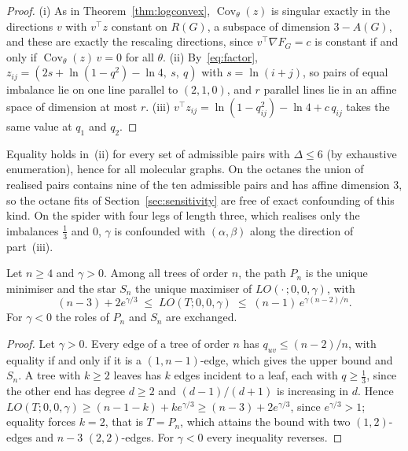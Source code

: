   \begin{proof}
  (i) As in Theorem~\ref{thm:logconvex}, $\operatorname{Cov}_{\theta}(z)$
  is singular exactly in the directions $v$ with $v^{\top} z$ constant on
  $R(G)$, a subspace of dimension $3 - A(G)$, and these are exactly the
  rescaling directions, since $v^{\top}\nabla F_G = c$ is constant if
  and only if $\operatorname{Cov}_{\theta}(z)\,v = 0$ for all $\theta$.
  (ii) By~\eqref{eq:factor},
  $z_{ij} = (2s + \ln(1-q^2) - \ln 4,\ s,\ q)$ with $s = \ln(i+j)$, so
  pairs of equal imbalance lie on one line parallel to $(2,1,0)$, and $r$
  parallel lines lie in an affine space of dimension at most $r$.
  (iii) $v^{\top} z_{ij} = \ln(1 - q_{ij}^2) - \ln 4 + c\,q_{ij}$ takes
  the same value at $q_1$ and $q_2$.
  \end{proof}

  Equality holds in~(ii) for every set of admissible pairs with
  $\Delta \le 6$ (by exhaustive enumeration), hence for all molecular
  graphs. On the octanes the union of realised pairs contains nine of the
  ten admissible pairs and has affine dimension $3$, so the octane fits
  of Section~\ref{sec:sensitivity} are free of exact confounding of this
  kind. On the spider with four legs of length three, which realises
  only the imbalances $\tfrac13$ and $0$, $\gamma$ is confounded with
  $(\alpha,\beta)$ along the direction of part~(iii).

\begin{proposition}\label{prop:extremal}
Let $n \ge 4$ and $\gamma > 0$. Among all trees of order $n$, the
path $P_n$ is the unique minimiser and the star $S_n$ the unique
maximiser of $LO(\cdot\,;0,0,\gamma)$, with
\[
(n-3) + 2e^{\gamma/3} \;\le\; LO(T;0,0,\gamma) \;\le\; (n-1)\,e^{\gamma(n-2)/n}.
\]
For $\gamma < 0$ the roles of $P_n$ and $S_n$ are exchanged.
\end{proposition}

\begin{proof}
Let $\gamma > 0$. Every edge of a tree of order $n$ has
$q_{uv} \le (n-2)/n$, with equality if and only if it is a
$(1,n-1)$-edge, which gives the upper bound and $S_n$. A tree with
$k \ge 2$ leaves has $k$ edges incident to a leaf, each with
$q \ge \tfrac13$, since the other end has degree $d \ge 2$ and
$(d-1)/(d+1)$ is increasing in $d$. Hence
$LO(T;0,0,\gamma) \ge (n-1-k) + k e^{\gamma/3} \ge (n-3) + 2e^{\gamma/3}$,
since $e^{\gamma/3} > 1$; equality forces $k = 2$, that is $T = P_n$, which
attains the bound with two $(1,2)$-edges and $n-3$ $(2,2)$-edges. For $\gamma < 0$ every
inequality reverses.
\end{proof}

